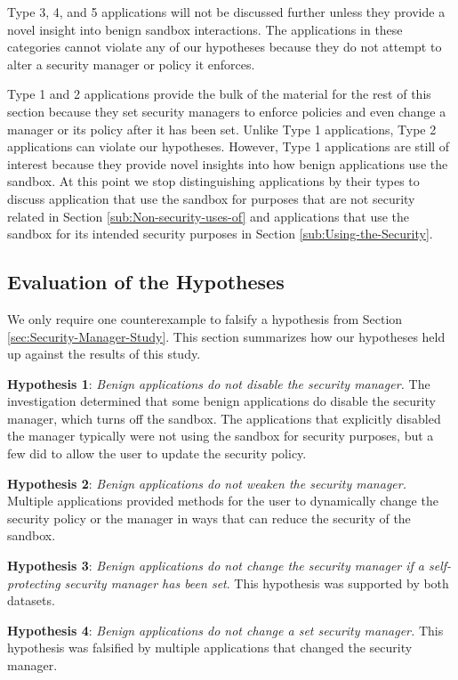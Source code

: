\documentclass{sig-alternate}
\begin{document}
Type 3, 4, and 5 applications will not be discussed further unless they provide a novel insight into benign sandbox interactions. The applications in these categories cannot violate any of our hypotheses because they do not attempt to alter a security manager or policy it enforces.

Type 1 and 2 applications provide the bulk of the material for the rest of this section because they set security managers to enforce policies and even change a manager or its policy after it has been set. Unlike Type 1 applications, Type 2 applications can violate our hypotheses. However, Type 1 applications are still of interest because they provide novel insights into how benign applications use the sandbox. At this point we stop distinguishing applications by their types to discuss application that use the sandbox for purposes that are not security related in Section \ref{sub:Non-security-uses-of}
and applications that use the sandbox for its intended security purposes in Section \ref{sub:Using-the-Security}.

\subsection{Evaluation of the Hypotheses}\label{sub:Evaluation-of-the-hypotheses}

We only require one counterexample to falsify a hypothesis from Section
\ref{sec:Security-Manager-Study}. This section summarizes how our
hypotheses held up against the results of this study.

\textbf{Hypothesis 1}: \emph{Benign applications do not disable
the security manager.} The investigation determined
that some benign applications do disable the security manager, which
turns off the sandbox. The applications that explicitly disabled the
manager typically were not using the sandbox for security purposes, but a few did to allow the user to update the security policy.

\textbf{Hypothesis 2}: \emph{Benign applications do not weaken the
security manager.} Multiple applications provided methods for the user to dynamically change the security policy or the manager in ways that can reduce the security of the sandbox.

\textbf{Hypothesis 3}: \emph{Benign applications do not change the
security manager if a self-protecting security manager has been set}.
This hypothesis was supported by both datasets.

\textbf{Hypothesis 4}: \emph{Benign applications do not change a
set security manager.} This hypothesis was falsified by multiple applications that changed the security manager.
\end{document}

